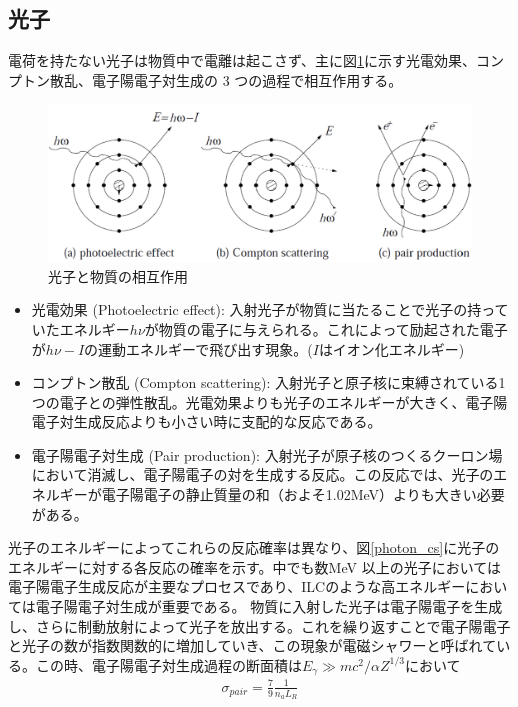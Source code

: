 \subsection{光子}
電荷を持たない光子は物質中で電離は起こさず、主に図\ref{photon}に示す光電効果、コンプトン散乱、電子陽電子対生成の 3 つの過程で相互作用する。
\begin{figure}[H]
	\begin{center}
 \includegraphics[keepaspectratio, scale =0.2]
 	{Figure/Siwecal/photon.png}
 		\caption{光子と物質の相互作用}
 		\label{photon}
	\end{center}
 \end{figure}
\begin{itemize}
 \item 光電効果 (Photoelectric effect): 入射光子が物質に当たることで光子の持っていたエネルギー$h\nu$が物質の電子に与えられる。これによって励起された電子が$h\nu - I$の運動エネルギーで飛び出す現象。($I$はイオン化エネルギー)
 \item コンプトン散乱 (Compton scattering): 入射光子と原子核に束縛されている1つの電子との弾性散乱。光電効果よりも光子のエネルギーが大きく、電子陽電子対生成反応よりも小さい時に支配的な反応である。
 \item 電子陽電子対生成 (Pair production): 入射光子が原子核のつくるクーロン場において消滅し、電子陽電子の対を生成する反応。この反応では、光子のエネルギーが電子陽電子の静止質量の和（およそ1.02MeV）よりも大きい必要がある。
\end{itemize} 
 光子のエネルギーによってこれらの反応確率は異なり、図\ref{photon_cs}に光子のエネルギーに対する各反応の確率を示す。中でも数MeV 以上の光子においては電子陽電子生成反応が主要なプロセスであり、ILCのような高エネルギーにおいては電子陽電子対生成が重要である。 物質に入射した光子は電子陽電子を生成し、さらに制動放射によって光子を放出する。これを繰り返すことで電子陽電子と光子の数が指数関数的に増加していき、この現象が電磁シャワーと呼ばれている。この時、電子陽電子対生成過程の断面積は$E_\gamma \gg mc^2/ \alpha Z^{1/3}$において
 \begin{align}
 \sigma_{pair} = \frac{7}{9}\frac{1}{n_a L_R}
 \end{align}
